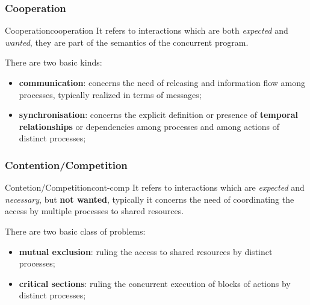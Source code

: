 \subsubsection{Cooperation}\label{sub:cp_cooperation} %
\begin{definition}{Cooperation}{cooperation}
    It refers to interactions which are both \textit{expected} and \textit{wanted}, they  are part of the semantics of the concurrent program.
\end{definition}
There are two basic kinds:
\begin{itemize}
    \item \textbf{communication}: concerns the need of releasing and information flow among processes, typically realized in terms of messages;
    \item \textbf{synchronisation}: concerns the explicit definition or presence of \textbf{temporal relationships} or dependencies among processes and among actions of distinct processes;
\end{itemize}
%
\subsubsection{Contention/Competition}\label{sub:cp_contention_competion} %
\begin{definition}{Contetion/Competition}{cont-comp}
    It refers to interactions which are \textit{expected} and \textit{necessary}, but \textbf{not wanted}, typically it concerns the need of coordinating the access by multiple processes to shared resources.
\end{definition}
There are two basic class of problems:
\begin{itemize}
    \item \textbf{mutual exclusion}: ruling the access to shared resources by distinct processes;
    \item \textbf{critical sections}: ruling the concurrent execution of blocks of actions by distinct processes;
\end{itemize}
%
